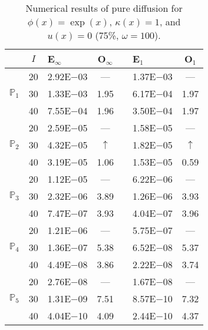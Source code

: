 \begin{table}[H]
\centering
\caption{Numerical results of pure diffusion for $\phi(x)=\exp(x)$, $\kappa(x)=1$, and $u(x)=0$ (75\%, $\omega=100$).}
\begin{tabular}{@{}l c l c c l c@{}}
\toprule
 & $I$ & E$_{\infty}$ & O$_{\infty}$ && E$_1$ & O$_1$\\
\midrule
\multirow{3}{*}{$\mathbb{P}_{1}$}
 & 20 & 2.92E$-$03 & --- && 1.37E$-$03 & ---\\
 & 30 & 1.33E$-$03 & 1.95 && 6.17E$-$04 & 1.97\\
 & 40 & 7.55E$-$04 & 1.96 && 3.50E$-$04 & 1.97\\
\midrule
\multirow{3}{*}{$\mathbb{P}_{2}$}
 & 20 & 2.59E$-$05 & --- && 1.58E$-$05 & ---\\
 & 30 & 4.32E$-$05 & $\uparrow$ && 1.82E$-$05 & $\uparrow$\\
 & 40 & 3.19E$-$05 & 1.06 && 1.53E$-$05 & 0.59\\
\midrule
\multirow{3}{*}{$\mathbb{P}_{3}$}
 & 20 & 1.12E$-$05 & --- && 6.22E$-$06 & ---\\
 & 30 & 2.32E$-$06 & 3.89 && 1.26E$-$06 & 3.93\\
 & 40 & 7.47E$-$07 & 3.93 && 4.04E$-$07 & 3.96\\
\midrule
\multirow{3}{*}{$\mathbb{P}_{4}$}
 & 20 & 1.21E$-$06 & --- && 5.75E$-$07 & ---\\
 & 30 & 1.36E$-$07 & 5.38 && 6.52E$-$08 & 5.37\\
 & 40 & 4.49E$-$08 & 3.86 && 2.22E$-$08 & 3.74\\
\midrule
\multirow{3}{*}{$\mathbb{P}_{5}$}
 & 20 & 2.76E$-$08 & --- && 1.67E$-$08 & ---\\
 & 30 & 1.31E$-$09 & 7.51 && 8.57E$-$10 & 7.32\\
 & 40 & 4.04E$-$10 & 4.09 && 2.44E$-$10 & 4.37\\
\bottomrule
\end{tabular}
\end{table}